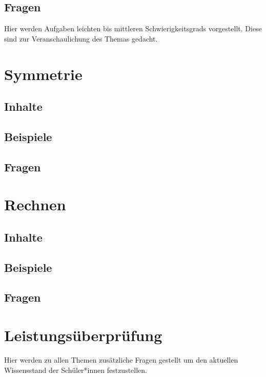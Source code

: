 \documentclass{article}
\begin{document}
\subsection{Fragen}
Hier werden Aufgaben leichten bis mittleren Schwierigkeitsgrads vorgestellt. Diese sind zur Veranschaulichung  des Themas gedacht. 
\newpage
\section{Symmetrie}
\subsection{Inhalte}
\subsection{Beispiele}
\subsection{Fragen}
\newpage
\section{Rechnen}
\subsection{Inhalte}
\subsection{Beispiele}
\subsection{Fragen}
\newpage
\section*{Leistungsüberprüfung}
Hier werden zu allen Themen zusätzliche Fragen gestellt um den aktuellen Wissensstand der Schüler*innen festzustellen.
\end{document}
